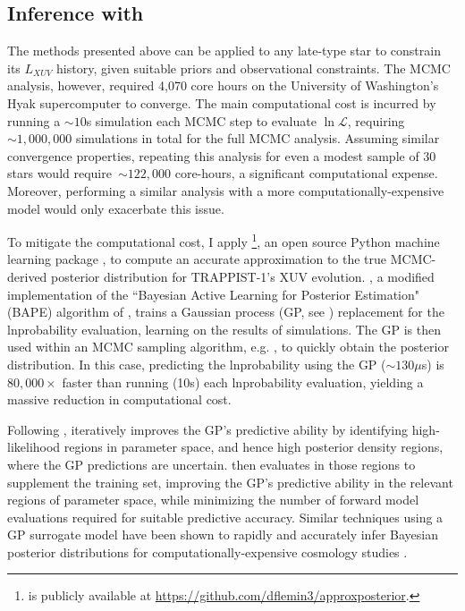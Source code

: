\subsection{Inference with \approxposterior} \label{trap:sec:methods:approx}

The methods presented above can be applied to any late-type star to constrain its $L_{XUV}$ history, given suitable priors and observational constraints. The MCMC analysis, however, required 4,070 core hours on the University of Washington's Hyak supercomputer to converge. The main computational cost is incurred by running a ${\sim}10$s \vplanet simulation each MCMC step to evaluate $\ln \mathcal{L}$, requiring ${\sim}1,000,000$ simulations in total for the full MCMC analysis. Assuming similar convergence properties, repeating this analysis for even a modest sample of 30 stars would require~${\sim} 122,000$ core-hours, a significant computational expense. Moreover, performing a similar analysis with a more computationally-expensive model would only exacerbate this issue.

To mitigate the computational cost, I apply \approxposterior\footnote{\approxposterior is publicly available at \href{https://github.com/dflemin3/approxposterior}{https://github.com/dflemin3/approxposterior}.}, an open source Python machine learning package \citep{FlemingVanderPlas2018}, to compute an accurate approximation to the true MCMC-derived posterior distribution for TRAPPIST-1's XUV evolution. \approxposterior, a modified implementation of the ``Bayesian Active Learning for Posterior Estimation" (BAPE) algorithm of \citet{Kandasamy2017}, trains a Gaussian process (GP, see \citet{Rasmussen2006}) replacement for the lnprobability evaluation, learning on the results of \vplanet simulations. The GP is then used within an MCMC sampling algorithm, e.g. \emcee, to quickly obtain the posterior distribution. In this case, predicting the lnprobability using the GP (${\sim} 130 \mu$s) is $80,000 \times$ faster than running \vplanet (10s) each lnprobability evaluation, yielding a massive reduction in computational cost.

Following \citet{Kandasamy2017}, \approxposterior iteratively improves the GP's predictive ability by identifying high-likelihood regions in parameter space, and hence high posterior density regions, where the GP predictions are uncertain. \approxposterior then evaluates \vplanet in those regions to supplement the training set, improving the GP's predictive ability in the relevant regions of parameter space, while minimizing the number of forward model evaluations required for suitable predictive accuracy. Similar techniques using a GP surrogate model have been shown to rapidly and accurately infer Bayesian posterior distributions for computationally-expensive cosmology studies \citep[e.g.][]{Bird2019,McClintock2019}. 

